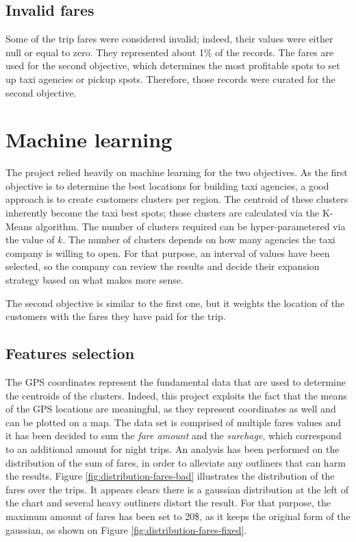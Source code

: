 \documentclass[a4paper]{article}
\begin{document}
\subsection{Invalid fares}
Some of the trip fares were considered invalid; indeed, their values were either null or equal to zero. They represented about 1\% of the records. The fares are used for the second objective, which determines the most profitable spots to set up taxi agencies or pickup spots. Therefore, those records were curated for the second objective.

\section{Machine learning}
The project relied heavily on machine learning for the two objectives. As the first objective is to determine the best locations for building taxi agencies, a good approach is to create customers clusters per region. The centroid of these clusters inherently become the taxi best spots; those clusters are calculated via the K-Means algorithm. The number of clusters required can be hyper-parametered via the value of $k$. The number of clusters depends on how many agencies the taxi company is willing to open. For that purpose, an interval of values have been selected, so the company can review the results and decide their expansion strategy based on what makes more sense.

The second objective is similar to the first one, but it weights the location of the customers with the fares they have paid for the trip.



\subsection{Features selection}
The GPS coordinates represent the fundamental data that are used to determine the centroids of the clusters. Indeed, this project exploits the fact that the means of the GPS locations are meaningful, as they represent coordinates as well and can be plotted on a map. The data set is comprised of multiple fares values and it has been decided to sum the \emph{fare amount} and the \emph{surchage}, which correspond to an additional amount for night trips. An analysis has been performed on the distribution of the sum of fares, in order to alleviate any outliners that can harm the results. Figure \ref{fig:distribution-fares-bad} illustrates the distribution of the fares over the trips. It appears clears there is a gaussian distribution at the left of the chart and several heavy outliners distort the result. For that purpose, the maximum amount of fares has been set to 20\$, as it keeps the original form of the gaussian, as shown on Figure \ref{fig:distribution-fares-fixed}.
\end{document}
